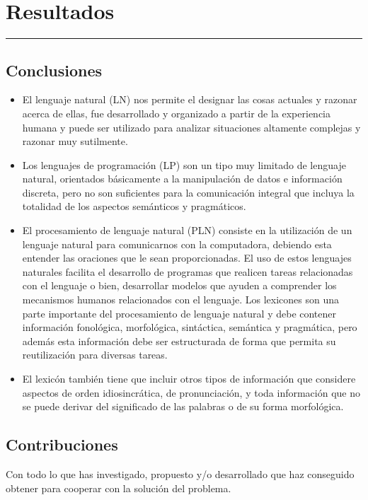 \chapter{Resultados}
\hrule \bigskip \vspace*{1cm}
\section{Conclusiones}
\begin{itemize}
  \item El lenguaje natural (LN) nos permite el designar las cosas actuales y razonar acerca de ellas, fue desarrollado y organizado a partir de la experiencia humana y puede ser utilizado para analizar situaciones altamente complejas y razonar muy sutilmente.
 \item  Los lenguajes de programación (LP) son un tipo muy limitado de lenguaje natural, orientados básicamente a la manipulación de datos e información discreta, pero no son suficientes para la comunicación integral que incluya la totalidad de los aspectos semánticos y pragmáticos.
 \item  El procesamiento de lenguaje natural (PLN) consiste en la utilización de un lenguaje natural para comunicarnos con la computadora, debiendo esta entender las oraciones que le sean proporcionadas. El uso de estos lenguajes naturales facilita el desarrollo de programas que realicen tareas relacionadas con el lenguaje o bien, desarrollar modelos que ayuden a comprender los mecanismos humanos relacionados con el lenguaje. Los lexicones son una parte importante del procesamiento de lenguaje natural y debe contener información fonológica, morfológica, sintáctica, semántica y pragmática, pero además esta información debe ser estructurada de forma que permita su reutilización para diversas tareas.
 \item  El lexicón también tiene que incluir otros tipos de información que considere aspectos de orden idiosincrática, de pronunciación, y toda información que no se puede derivar del significado de las palabras o de su forma morfológica.
\end{itemize}

\section{Contribuciones}

Con todo lo que has investigado, propuesto y/o desarrollado que haz
conseguido obtener para cooperar con la solución del problema.

